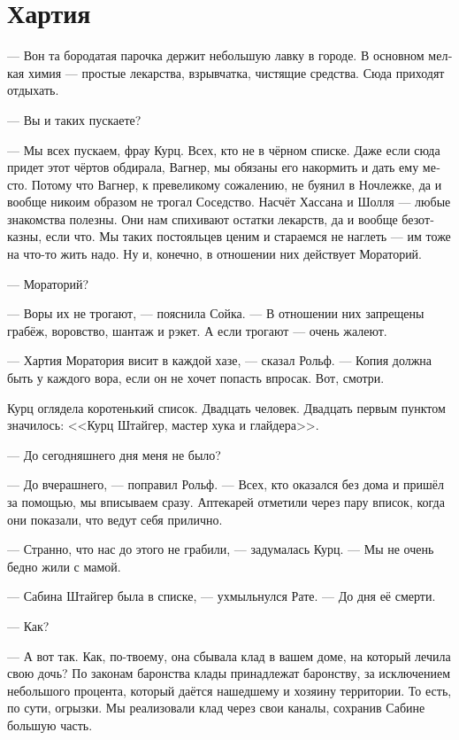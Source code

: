 \documentclass[a4paper,12pt,fleqn]{book}\usepackage{cooltooltips}\usepackage{polyglossia}\setdefaultlanguage[babelshorthands=true]{russian}\setotherlanguage{english}\defaultfontfeatures{Ligatures=TeX,Mapping=tex-text} \usepackage{xcolor}\definecolor{lightgray}{HTML}{bbbbbb}\color{lightgray}\newcommand{\ml}[3]{\textenglish{\textcolor{black}{#3}}}
\begin{document}
\section{Хартия}

--- Вон та бородатая парочка держит небольшую лавку в городе.
В основном мелкая химия --- простые лекарства, взрывчатка, чистящие средства.
Сюда приходят отдыхать.

--- Вы и таких пускаете?

--- Мы всех пускаем, фрау Курц.
Всех, кто не в чёрном списке.
Даже если сюда придет этот чёртов обдирала, Вагнер, мы обязаны его накормить и дать ему место.
Потому что Вагнер, к превеликому сожалению, не буянил в Ночлежке, да и вообще никоим образом не трогал Соседство.
Насчёт Хассана и Шолля --- любые знакомства полезны. 
Они нам спихивают остатки лекарств, да и вообще безотказны, если что.
Мы таких постояльцев ценим и стараемся не наглеть --- им тоже на что-то жить надо.
Ну и, конечно, в отношении них действует Мораторий.

--- Мораторий?

--- Воры их не трогают, --- пояснила Сойка.
--- В отношении них запрещены грабёж, воровство, шантаж и рэкет.
А если трогают --- очень жалеют.

--- Хартия Моратория висит в каждой хазе, --- сказал Рольф.
--- Копия должна быть у каждого вора, если он не хочет попасть впросак.
Вот, смотри.

Курц оглядела коротенький список.
Двадцать человек.
Двадцать первым пунктом значилось: <<Курц Штайгер, мастер хука и глайдера>>.

--- До сегодняшнего дня меня не было?

--- До вчерашнего, --- поправил Рольф.
--- Всех, кто оказался без дома и пришёл за помощью, мы вписываем сразу.
Аптекарей отметили через пару вписок, когда они показали, что ведут себя прилично.

--- Странно, что нас до этого не грабили, --- задумалась Курц.
--- Мы не очень бедно жили с мамой.

--- Сабина Штайгер была в списке, --- ухмыльнулся Рате.
--- До дня её смерти.

--- Как?

--- А вот так.
Как, по-твоему, она сбывала клад в вашем доме, на который лечила свою дочь?
По законам баронства клады принадлежат баронству, за исключением небольшого процента, который даётся нашедшему и хозяину территории.
То есть, по сути, огрызки.
Мы реализовали клад через свои каналы, сохранив Сабине большую часть.
\end{document}

